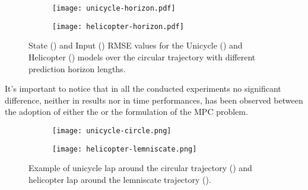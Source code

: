 \documentclass[../main.tex]{subfiles}
\begin{document}
\begin{figure}[htb]
	\centering
    \begin{subfigure}[b]{0.49\textwidth}
        \centering
		\texttt{[image: unicycle-horizon.pdf]}
    \end{subfigure}
    \hfill
    \begin{subfigure}[b]{0.49\textwidth}
        \centering
		\texttt{[image: helicopter-horizon.pdf]}
    \end{subfigure}
	\caption{State () and Input () RMSE values for the Unicycle () and Helicopter
		() models over the circular trajectory with different prediction horizon
lengths.}\label{fig:horizon}
\end{figure}

It's important to notice that in all the conducted experiments no significant
difference, neither in results nor in time performances, has been
observed between the adoption of either the  or the 
formulation of the MPC problem.

\begin{figure}[htb]
	\centering
    \begin{subfigure}[b]{0.40\textwidth}
        \centering
		\texttt{[image: unicycle-circle.png]}
    \end{subfigure}
    \hfill
    \begin{subfigure}[b]{0.59\textwidth}
        \centering
		\texttt{[image: helicopter-lemniscate.png]}
    \end{subfigure}
	\caption{Example of unicycle lap around the circular trajectory ()
	and helicopter lap around the lemniscate trajectory
().}\label{fig:example}
\end{figure}
\end{document}
